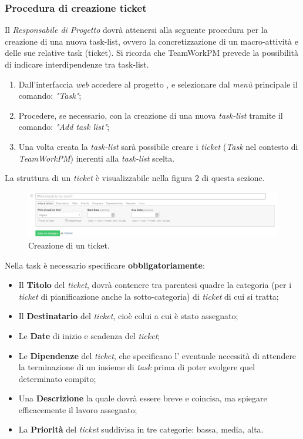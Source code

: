 \subsubsection{Procedura di creazione ticket} 
Il \textit{Responsabile di Progetto} dovrà attenersi alla seguente procedura per la creazione di una nuova task-list, ovvero la concretizzazione di un macro-attività e delle sue relative task (ticket). Si ricorda che TeamWorkPM prevede la possibilità di indicare interdipendenze tra task-list.
\begin{enumerate}
\item Dall'interfaccia \textit{web} accedere al progetto \progetto{}, e selezionare dal \textit{menù} principale il comando: \emph{"Task"};
\item Procedere, se necessario, con la creazione di una nuova \textit{task-list} tramite il comando: \emph{"Add task list"};
\item Una volta creata la \textit{task-list} sarà possibile creare i \textit{ticket} (\textit{Task} nel contesto di \textit{TeamWorkPM}) inerenti alla \textit{task-list} scelta.
\end{enumerate}

La struttura di un \textit{ticket} è visualizzabile nella figura 2 di questa sezione.
\begin{figure}
\centering
\includegraphics[width=%
\linewidth]{immaginiNDP/creazionetask}
\caption[]{Creazione di un ticket.}
\label{fig:creazionetask}
\end{figure}

Nella task è necessario specificare \textbf{obbligatoriamente}:
\begin{itemize}
\item Il \textbf{Titolo} del \textit{ticket}, dovrà contenere tra parentesi quadre la categoria (per i \textit{ticket} di pianificazione anche la sotto-categoria) di \textit{ticket} di cui si tratta;
\item Il \textbf{Destinatario} del \textit{ticket}, cioè colui a cui è stato assegnato;
\item Le \textbf{Date} di inizio e scadenza del \textit{ticket};
\item Le \textbf{Dipendenze} del \textit{ticket}, che specificano l' eventuale necessità di attendere la terminazione di un insieme di \textit{task} prima di poter svolgere quel determinato compito;
\item Una \textbf{Descrizione} la quale dovrà essere breve e coincisa, ma spiegare efficacemente il lavoro assegnato;
\item La \textbf{Priorità} del \textit{ticket} suddivisa in tre categorie: bassa, media, alta.
\end{itemize}

